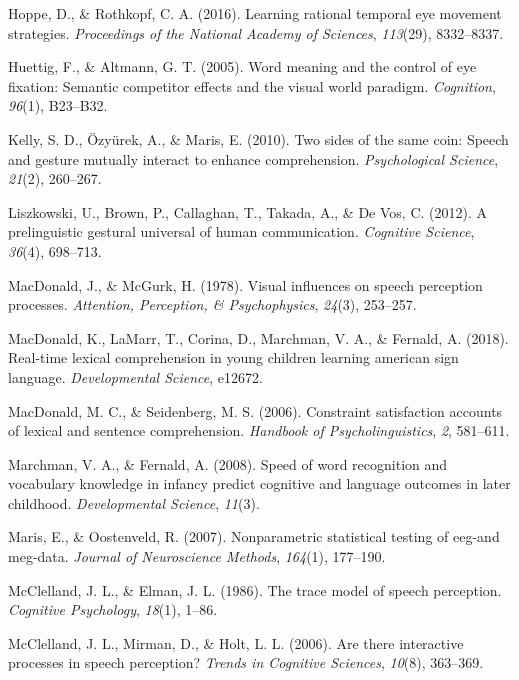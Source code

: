 \documentclass[,man,floatsintext]{apa6}
\begin{document}
\hypertarget{ref-hoppe2016learning}{}
Hoppe, D., \& Rothkopf, C. A. (2016). Learning rational temporal eye
movement strategies. \emph{Proceedings of the National Academy of
Sciences}, \emph{113}(29), 8332--8337.

\hypertarget{ref-huettig2005word}{}
Huettig, F., \& Altmann, G. T. (2005). Word meaning and the control of
eye fixation: Semantic competitor effects and the visual world paradigm.
\emph{Cognition}, \emph{96}(1), B23--B32.

\hypertarget{ref-kelly2010two}{}
Kelly, S. D., Özyürek, A., \& Maris, E. (2010). Two sides of the same
coin: Speech and gesture mutually interact to enhance comprehension.
\emph{Psychological Science}, \emph{21}(2), 260--267.

\hypertarget{ref-liszkowski2012prelinguistic}{}
Liszkowski, U., Brown, P., Callaghan, T., Takada, A., \& De Vos, C.
(2012). A prelinguistic gestural universal of human communication.
\emph{Cognitive Science}, \emph{36}(4), 698--713.

\hypertarget{ref-macdonald1978visual}{}
MacDonald, J., \& McGurk, H. (1978). Visual influences on speech
perception processes. \emph{Attention, Perception, \& Psychophysics},
\emph{24}(3), 253--257.

\hypertarget{ref-macdonald2018real}{}
MacDonald, K., LaMarr, T., Corina, D., Marchman, V. A., \& Fernald, A.
(2018). Real-time lexical comprehension in young children learning
american sign language. \emph{Developmental Science}, e12672.

\hypertarget{ref-macdonald2006constraint}{}
MacDonald, M. C., \& Seidenberg, M. S. (2006). Constraint satisfaction
accounts of lexical and sentence comprehension. \emph{Handbook of
Psycholinguistics}, \emph{2}, 581--611.

\hypertarget{ref-marchman2008speed}{}
Marchman, V. A., \& Fernald, A. (2008). Speed of word recognition and
vocabulary knowledge in infancy predict cognitive and language outcomes
in later childhood. \emph{Developmental Science}, \emph{11}(3).

\hypertarget{ref-maris2007nonparametric}{}
Maris, E., \& Oostenveld, R. (2007). Nonparametric statistical testing
of eeg-and meg-data. \emph{Journal of Neuroscience Methods},
\emph{164}(1), 177--190.

\hypertarget{ref-mcclelland1986trace}{}
McClelland, J. L., \& Elman, J. L. (1986). The trace model of speech
perception. \emph{Cognitive Psychology}, \emph{18}(1), 1--86.

\hypertarget{ref-mcclelland2006there}{}
McClelland, J. L., Mirman, D., \& Holt, L. L. (2006). Are there
interactive processes in speech perception? \emph{Trends in Cognitive
Sciences}, \emph{10}(8), 363--369.
\end{document}
